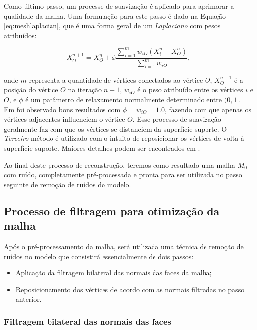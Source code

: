 Como último passo, um processo de suavização é aplicado para aprimorar a qualidade da malha. Uma formulação para este passo é dado na Equação \ref{eq:meshlaplacian}, que é uma forma geral de um \textit{Laplaciano} com pesos atribuídos:

\begin{equation} \label{eq:meshlaplacian}
    X^{n+1}_O = X^{n}_O + \phi \frac{\sum^{m}_{i=1} w_{iO}(X^{n}_i - X^{n}_O) }{\sum^{m}_{i=1} w_{iO}},
\end{equation}

onde $m$ representa a quantidade de vértices conectados ao vértice $O$, $X^{n+1}_O$ é a posição do vértice $O$ na iteração $n+1$, $w_{iO}$ é o peso atribuído entre os vértices $i$ e $O$, e $\phi$ é um parâmetro de relaxamento normalmente determinado entre $(0,1]$. Em \cite{miranda2009surface} foi observado bons resultados com $\phi = w_{iO} = 1.0$, fazendo com que apenas os vértices adjacentes influenciem o vértice $O$. Esse processo de suavização geralmente faz com que os vértices se distanciem da superfície suporte. O \textit{Terceiro} método é utilizado com o intuito de reposicionar os vértices de volta à superfície suporte. Maiores detalhes podem ser encontrados em \cite{miranda2009surface}. 

Ao final deste processo de reconstrução, teremos como resultado uma malha $M_0$ com ruído, completamente pré-processada e pronta para ser utilizada no passo seguinte de remoção de ruídos do modelo.


\subsection{Processo de filtragem para otimização da malha}

Após o pré-processamento da malha, será utilizada uma técnica de remoção de ruídos no modelo que consistirá essencialmente de dois passos:

\begin{itemize}
    \item Aplicação da filtragem bilateral das normais das faces da malha;
    \item Reposicionamento dos vértices de acordo com as normais filtradas no passo anterior.
\end{itemize}


\subsubsection{Filtragem bilateral das normais das faces}

